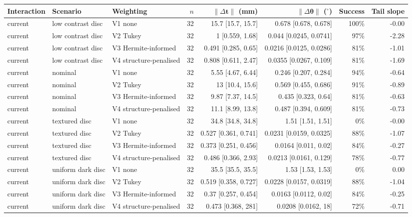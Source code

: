\begin{tabular}{@{}lllrrrrr@{}}
\toprule
Interaction & Scenario & Weighting & $n$ & $\lVert\Delta\mathbf{t}\rVert$ (mm) & $\lVert\Delta\boldsymbol{\theta}\rVert$ ($^\circ$) & Success & Tail slope \\
\midrule
current & low contrast disc & V1 none & 32 & 15.7 [15.7, 15.7] & 0.678 [0.678, 0.678] & 100\% & -0.00 \\
current & low contrast disc & V2 Tukey & 32 & 1 [0.559, 1.68] & 0.044 [0.0245, 0.0741] & 97\% & -2.28 \\
current & low contrast disc & V3 Hermite-informed & 32 & 0.491 [0.285, 0.65] & 0.0216 [0.0125, 0.0286] & 81\% & -1.01 \\
current & low contrast disc & V4 structure-penalised & 32 & 0.808 [0.611, 2.47] & 0.0355 [0.0267, 0.109] & 81\% & -1.69 \\
current & nominal & V1 none & 32 & 5.55 [4.67, 6.44] & 0.246 [0.207, 0.284] & 94\% & -0.64 \\
current & nominal & V2 Tukey & 32 & 13 [10.4, 15.6] & 0.569 [0.455, 0.686] & 91\% & -0.89 \\
current & nominal & V3 Hermite-informed & 32 & 9.87 [7.37, 14.5] & 0.435 [0.323, 0.64] & 81\% & -0.63 \\
current & nominal & V4 structure-penalised & 32 & 11.1 [8.99, 13.8] & 0.487 [0.394, 0.609] & 81\% & -0.73 \\
current & textured disc & V1 none & 32 & 34.8 [34.8, 34.8] & 1.51 [1.51, 1.51] & 0\% & -0.00 \\
current & textured disc & V2 Tukey & 32 & 0.527 [0.361, 0.741] & 0.0231 [0.0159, 0.0325] & 88\% & -1.07 \\
current & textured disc & V3 Hermite-informed & 32 & 0.373 [0.251, 0.456] & 0.0164 [0.011, 0.02] & 84\% & -0.27 \\
current & textured disc & V4 structure-penalised & 32 & 0.486 [0.366, 2.93] & 0.0213 [0.0161, 0.129] & 78\% & -0.77 \\
current & uniform dark disc & V1 none & 32 & 35.5 [35.5, 35.5] & 1.53 [1.53, 1.53] & 0\% & 0.00 \\
current & uniform dark disc & V2 Tukey & 32 & 0.519 [0.358, 0.727] & 0.0228 [0.0157, 0.0319] & 88\% & -1.04 \\
current & uniform dark disc & V3 Hermite-informed & 32 & 0.37 [0.257, 0.454] & 0.0163 [0.0112, 0.02] & 84\% & -0.25 \\
current & uniform dark disc & V4 structure-penalised & 32 & 0.473 [0.368, 281] & 0.0208 [0.0162, 18] & 72\% & -0.71 \\

\end{tabular}
